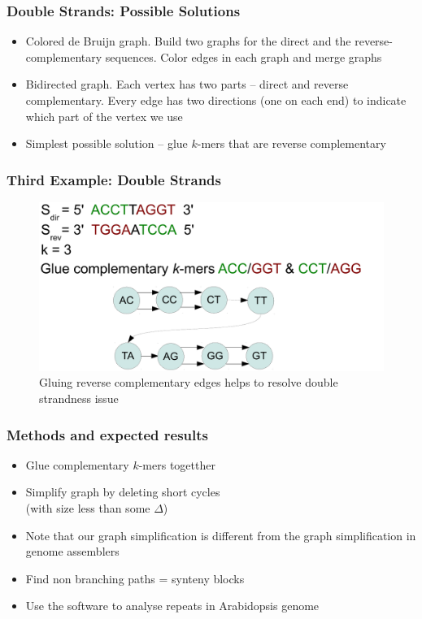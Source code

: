\documentclass[svgnames,14pt]{beamer}
\begin{document}
\begin{frame}
\frametitle{Double Strands: Possible Solutions}
\begin{itemize}
\item Colored de Bruijn graph. Build two graphs for the direct and the reverse-complementary sequences. Color edges in each graph and merge graphs
\item Bidirected graph. Each vertex has two parts -- direct and reverse complementary. Every edge has two directions (one on each end) to indicate which part of the vertex we use
\item Simplest possible solution -- glue \( k \)-mers that are reverse complementary
\end{itemize}
\end{frame}

\begin{frame}
\frametitle{Third Example: Double Strands}
\begin{figure}
\centering
\includegraphics[scale = 0.60]{Figure5.pdf}
\small \caption{Gluing reverse complementary edges helps to resolve double strandness issue}
\end{figure}
\end{frame}

\begin{frame}
\frametitle{Methods and expected results}
\begin{itemize}
\item Glue complementary \(k\)-mers togetther
\item Simplify graph by deleting short cycles \\ (with size less than some \( \Delta \))
\item Note that our graph simplification is different from the graph simplification in genome assemblers
\item Find non branching paths = synteny blocks
\item Use the software to analyse repeats in Arabidopsis genome
\end{itemize}
\end{frame}
\end{document}
